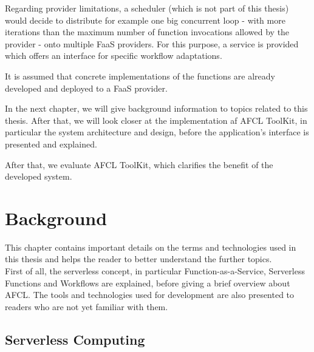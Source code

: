 \documentclass[a4paper,top=25mm,bottom=25mm,12pt,pdftex,halfparskip,twoside,bibtotoc,numbers=noenddot]{scrbook}
\begin{document}
Regarding provider limitations, a scheduler (which is not part of this thesis) would decide to distribute for example one big concurrent loop - with more iterations than the maximum number of function invocations allowed by the provider - onto multiple FaaS providers. For this purpose, a service is provided which offers an interface for specific workflow adaptations.


It is assumed that concrete implementations of the functions are already developed and deployed to a FaaS provider.

In the next chapter, we will give background information to topics related to this thesis. After that, we will look closer at the implementation af AFCL ToolKit, in particular the system architecture and design, before the application's interface is presented and explained. 

After that, we evaluate AFCL ToolKit, which clarifies the benefit of the developed system.


\label{chap:background}
\chapter{Background}

This chapter contains important details on the terms and technologies used in this thesis and helps the reader to better understand the further topics.\\
First of all, the serverless concept, in particular Function-as-a-Service, Serverless Functions and Workflows are explained, before giving a brief overview about AFCL. The tools and technologies used for development are also presented to readers who are not yet familiar with them.

\section{Serverless Computing}
\end{document}
